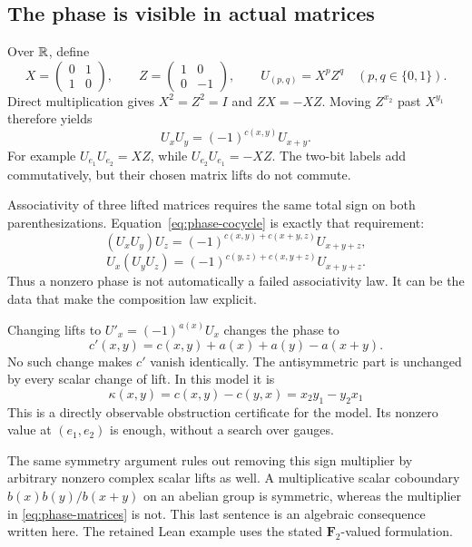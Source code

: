 
\subsection{The phase is visible in actual matrices}
Over \(\mathbb R\), define
\[
 X=\begin{pmatrix}0&1\\1&0\end{pmatrix},\qquad
 Z=\begin{pmatrix}1&0\\0&-1\end{pmatrix},\qquad
 U_{(p,q)}=X^pZ^q\quad(p,q\in\{0,1\}).
\]
Direct multiplication gives \(X^2=Z^2=I\) and \(ZX=-XZ\). Moving \(Z^{x_2}\) past \(X^{y_1}\) therefore yields
\begin{equation}\label{eq:phase-matrices}
 U_xU_y=(-1)^{c(x,y)}U_{x+y}.
\end{equation}
For example \(U_{e_1}U_{e_2}=XZ\), while \(U_{e_2}U_{e_1}=-XZ\). The two-bit labels add commutatively, but their chosen matrix lifts do not commute.

Associativity of three lifted matrices requires the same total sign on both parenthesizations. Equation~\eqref{eq:phase-cocycle} is exactly that requirement:
\[
 (U_xU_y)U_z
 =(-1)^{c(x,y)+c(x+y,z)}U_{x+y+z},
\]
\[
 U_x(U_yU_z)
 =(-1)^{c(y,z)+c(x,y+z)}U_{x+y+z}.
\]
Thus a nonzero phase is not automatically a failed associativity law. It can be the data that make the composition law explicit.

Changing lifts to \(U'_x=(-1)^{a(x)}U_x\) changes the phase to
\[
 c'(x,y)=c(x,y)+a(x)+a(y)-a(x+y).
\]
No such change makes \(c'\) vanish identically. The antisymmetric part is unchanged by every scalar change of lift. In this model it is
\[
 \kappa(x,y)=c(x,y)-c(y,x)
            =x_2y_1-y_2x_1
\]
This is a directly observable obstruction certificate for the model. Its nonzero value at \((e_1,e_2)\) is enough, without a search over gauges.

The same symmetry argument rules out removing this sign multiplier by arbitrary nonzero complex scalar lifts as well. A multiplicative scalar coboundary \(b(x)b(y)/b(x+y)\) on an abelian group is symmetric, whereas the multiplier in \eqref{eq:phase-matrices} is not. This last sentence is an algebraic consequence written here. The retained Lean example uses the stated \(\mathbf F_2\)-valued formulation.

